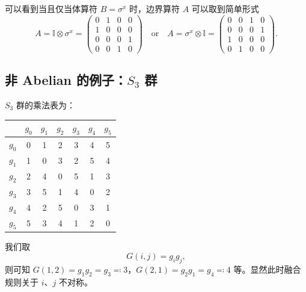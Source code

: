 可以看到当且仅当体算符 $B=\sigma^x$ 时，边界算符 $A$ 可以取到简单形式
\begin{equation}
  A = \mathbb{I} \otimes \sigma^x = \begin{pmatrix}
    0 & 1 & 0 & 0 \\
    1 & 0 & 0 & 0 \\
    0 & 0 & 0 & 1 \\
    0 & 0 & 1 & 0
  \end{pmatrix}
  \quad \text{or} \quad
  A = \sigma^x \otimes \mathbb{I} = \begin{pmatrix}
    0 & 0 & 1 & 0 \\
    0 & 0 & 0 & 1 \\
    1 & 0 & 0 & 0 \\
    0 & 1 & 0 & 0
  \end{pmatrix}.
\end{equation}

\subsection{非 Abelian 的例子：\texorpdfstring{$S_3$}{𝑆₃} 群}

$S_3$ 群的乘法表为：
\begin{center}
  \begin{tabular}{c|cccccc}
    & $g_0$ & $g_1$ & $g_2$ & $g_3$ & $g_4$ & $g_5$ \\
    \hline
    $g_0$ & 0 & 1 & 2 & 3 & 4 & 5 \\
    $g_1$ & 1 & 0 & 3 & 2 & 5 & 4 \\
    $g_2$ & 2 & 4 & 0 & 5 & 1 & 3 \\
    $g_3$ & 3 & 5 & 1 & 4 & 0 & 2 \\
    $g_4$ & 4 & 2 & 5 & 0 & 3 & 1 \\
    $g_5$ & 5 & 3 & 4 & 1 & 2 & 0
  \end{tabular}
\end{center}
我们取
\begin{equation}
  G(i,j) = g_i g_j,
\end{equation}
则可知 $G(1,2)=g_1 g_2=g_3\eqcolon3$，$G(2,1)=g_2 g_1=g_4\eqcolon4$ 等。显然此时融合规则关于 $i$、$j$ 不对称。

